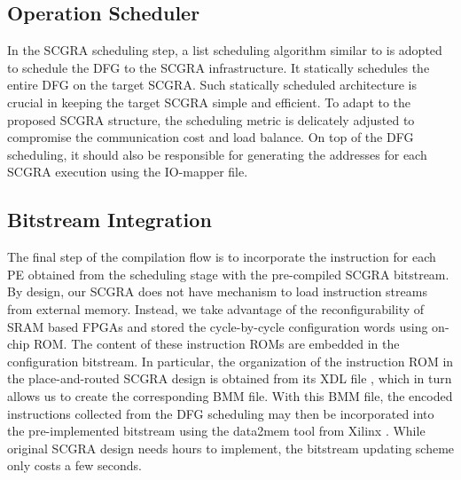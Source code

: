 \subsection{Operation Scheduler}
In the SCGRA scheduling step, a list scheduling algorithm similar to \cite{colinheart} is adopted to schedule the DFG to the SCGRA infrastructure. It statically schedules the entire DFG on the target SCGRA. Such statically scheduled architecture is crucial in keeping the target SCGRA simple and efficient. To adapt to the proposed SCGRA structure, the scheduling metric is delicately adjusted to compromise the communication cost and load balance. On top of the DFG scheduling, it should also be responsible for generating the addresses for each SCGRA execution using the IO-mapper file. 

\subsection{Bitstream Integration}
The final step of the compilation flow is to incorporate the instruction for each PE obtained from the scheduling stage with the pre-compiled SCGRA bitstream. By design, our SCGRA does not have mechanism to load instruction streams from external memory. Instead, we take advantage of the reconfigurability of SRAM based FPGAs and stored the cycle-by-cycle configuration words using on-chip ROM. The content of these instruction ROMs are embedded in the configuration bitstream. In particular, the organization of the instruction ROM in the place-and-routed SCGRA design is obtained from its XDL file \cite{beckhoff2011xilinx}, which in turn allows us to create the corresponding BMM file. With this BMM file, the encoded instructions collected from the DFG scheduling may then be incorporated into the pre-implemented bitstream using the data2mem tool from Xilinx \cite{data2mem}. While original SCGRA design needs hours to implement, the bitstream updating scheme only costs a few seconds.
